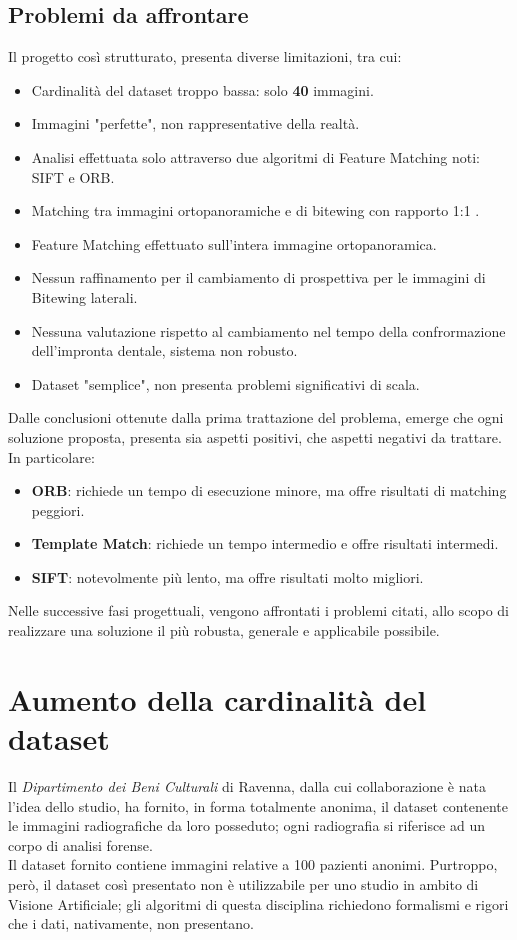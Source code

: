 \documentclass[12pt,a4paper,openright,twoside]{book}
\begin{document}
\section{Problemi da affrontare}
Il progetto così strutturato, presenta diverse limitazioni, tra cui:
\begin{itemize}
\item Cardinalità del dataset troppo bassa: solo \textbf{40} immagini.
\item Immagini "perfette", non rappresentative della realtà.
\item Analisi effettuata solo attraverso due algoritmi di Feature Matching noti: SIFT e ORB. %
\item Matching tra  immagini ortopanoramiche e di bitewing con rapporto 1:1 .
\item Feature Matching effettuato sull'intera immagine ortopanoramica.
\item Nessun raffinamento per il cambiamento di prospettiva per le immagini di Bitewing laterali.
\item Nessuna valutazione rispetto al cambiamento nel tempo della confrormazione dell'impronta dentale, sistema non robusto. %
\item Dataset  "semplice", non presenta problemi significativi di scala.
\end{itemize}
Dalle conclusioni ottenute dalla prima trattazione del problema, emerge che ogni soluzione proposta, presenta sia aspetti positivi, che aspetti negativi da trattare. In particolare:
\begin{itemize}
\item \textbf{ORB}: richiede un tempo di esecuzione minore, ma offre risultati di matching peggiori.
\item \textbf{Template Match}: richiede un tempo intermedio e offre risultati intermedi.
\item \textbf{SIFT}: notevolmente più lento, ma offre risultati molto migliori.
\end{itemize}
Nelle successive fasi progettuali, vengono affrontati i problemi citati, allo scopo di realizzare una soluzione il più robusta, generale e applicabile possibile.


\chapter{Aumento della cardinalità del dataset}
Il {\itshape Dipartimento dei Beni Culturali} di Ravenna, dalla cui collaborazione è nata l'idea dello studio, ha fornito, in forma totalmente anonima, il dataset contenente le immagini radiografiche da loro posseduto; ogni radiografia si riferisce ad un corpo di analisi forense. \\
Il dataset fornito contiene immagini relative a 100 pazienti anonimi. Purtroppo, però, il dataset così presentato non è utilizzabile per uno studio in ambito di Visione Artificiale; gli algoritmi di questa disciplina richiedono formalismi e rigori che i dati, nativamente, non presentano.\\
\end{document}
